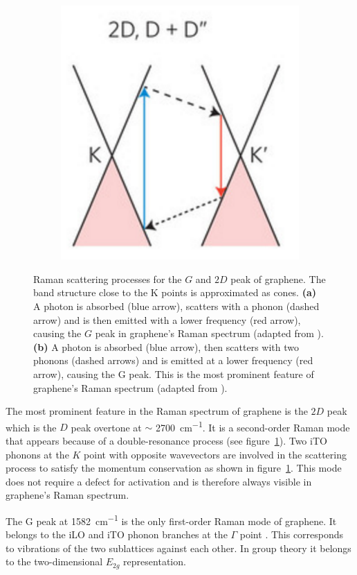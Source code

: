 \begin{figure}[!h]
\begin{subfigure}{0.2\textwidth}
  \end{subfigure}
  ~
  \begin{subfigure}{0.45\textwidth}
    \includegraphics[width=\textwidth]{./images/2d-mode.png}
  \end{subfigure}
  \caption{Raman scattering processes for the $G$ and $2D$ peak of graphene. The band structure close to the K points is approximated as cones. \textbf{(a)} A photon is absorbed (blue arrow), scatters with a phonon (dashed arrow) and is then emitted with a lower frequency (red arrow), causing the $G$ peak in graphene's Raman spectrum (adapted from \cite{Ferrari2013}). \textbf{(b)} A photon is absorbed (blue arrow), then scatters with two phonons (dashed arrows) and is emitted at a lower frequency (red arrow), causing the G peak. This is the most prominent feature of graphene's Raman spectrum (adapted from \cite{Ferrari2013}). }
  \label{fig:raman-modes}
\end{figure}

The most prominent feature in the Raman spectrum of graphene is the $2D$ peak which is the $D$ peak overtone at $\sim$ \SI{2700}{cm^{-1}}. It is a second-order Raman mode that appears because of a double-resonance process (see figure~\ref{fig:raman-modes}). Two iTO phonons at the $K$ point with opposite wavevectors are involved in the scattering process to satisfy the momentum conservation as shown in figure~\ref{fig:raman-modes}. This mode does not require a defect for activation and is therefore always visible in graphene's Raman spectrum.

The G peak at \SI{1582}{cm^{-1}} is the only first-order Raman mode of graphene. It belongs to the iLO and iTO phonon branches at the $\Gamma$ point \cite{Ferrari2013}. This corresponds to vibrations of the two sublattices against each other. In group theory it belongs to the two-dimensional $E_{2g}$ representation\cite{yucordona}.

